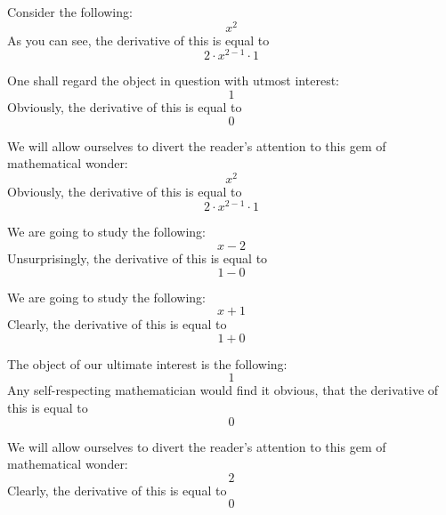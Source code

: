 \documentclass{article}
\begin{document}
Consider the following:
\begin{equation}
x ^{2 } 
\end{equation}
As you can see, the derivative of this is equal to
\begin{equation}
2 \cdot x ^{2 - 1 } \cdot 1 
\end{equation}

One shall regard the object in question with utmost interest:
\begin{equation}
1 
\end{equation}
Obviously, the derivative of this is equal to
\begin{equation}
0 
\end{equation}

We will allow ourselves to divert the reader's attention to this gem of mathematical wonder:
\begin{equation}
x ^{2 } 
\end{equation}
Obviously, the derivative of this is equal to
\begin{equation}
2 \cdot x ^{2 - 1 } \cdot 1 
\end{equation}

We are going to study the following:
\begin{equation}
x - 2 
\end{equation}
Unsurprisingly, the derivative of this is equal to
\begin{equation}
1 - 0 
\end{equation}

We are going to study the following:
\begin{equation}
x + 1 
\end{equation}
Clearly, the derivative of this is equal to
\begin{equation}
1 + 0 
\end{equation}

The object of our ultimate interest is the following:
\begin{equation}
1 
\end{equation}
Any self-respecting mathematician would find it obvious, that the derivative of this is equal to
\begin{equation}
0 
\end{equation}

We will allow ourselves to divert the reader's attention to this gem of mathematical wonder:
\begin{equation}
2 
\end{equation}
Clearly, the derivative of this is equal to
\begin{equation}
0 
\end{equation}
\end{document}
